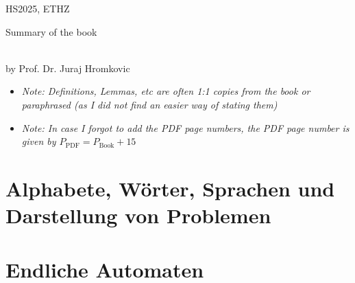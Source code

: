 \documentclass{article}
\begin{document}
\vspace{3cm}
\begin{center}
    HS2025, ETHZ\\[0.2cm]
    \begin{Large}
        Summary of the book \color{MidnightBlue}\color{black}
    \end{Large}\\[0.2cm]
    by Prof. Dr. Juraj Hromkovic
\end{center}

\newpage


\begin{scriptsize}
    \begin{itemize}
        \item \textit{Note: Definitions, Lemmas, etc are often 1:1 copies from the book or paraphrased (as I did not find an easier way of stating them)}
        \item \textit{Note: In case I forgot to add the PDF page numbers, the PDF page number is given by $P_{\text{PDF}} = P_{\text{Book}} + 15$}
    \end{itemize}
\end{scriptsize}

\newpage





\newsection
\section{Alphabete, Wörter, Sprachen und Darstellung von Problemen}





\newsection
\section{Endliche Automaten}




\end{document}
